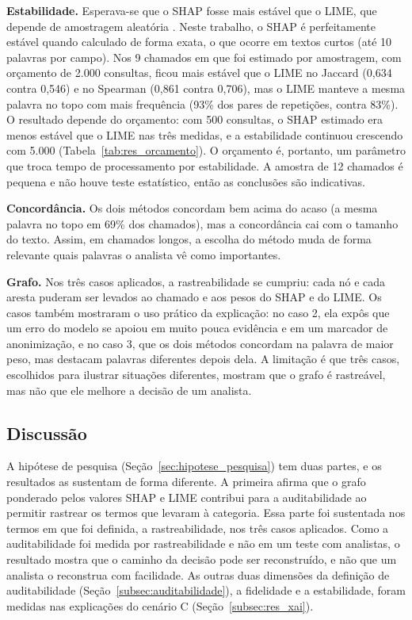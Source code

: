 \documentclass[
    12pt,                %
    openright,           %
    oneside,             %
    a4paper,             %
    english,             %
    brazil               %
]{abntex2}
\begin{document}
\textbf{Estabilidade.} Esperava-se que o SHAP fosse mais estável que o LIME, que depende de amostragem aleatória \cite{ribeiro2016}. Neste trabalho, o SHAP é perfeitamente estável quando calculado de forma exata, o que ocorre em textos curtos (até 10 palavras por campo). Nos 9 chamados em que foi estimado por amostragem, com orçamento de 2.000 consultas, ficou mais estável que o LIME no Jaccard (0,634 contra 0,546) e no Spearman (0,861 contra 0,706), mas o LIME manteve a mesma palavra no topo com mais frequência (93\% dos pares de repetições, contra 83\%). O resultado depende do orçamento: com 500 consultas, o SHAP estimado era menos estável que o LIME nas três medidas, e a estabilidade continuou crescendo com 5.000 (Tabela~\ref{tab:res_orcamento}). O orçamento é, portanto, um parâmetro que troca tempo de processamento por estabilidade. A amostra de 12 chamados é pequena e não houve teste estatístico, então as conclusões são indicativas.
 
\textbf{Concordância.} Os dois métodos concordam bem acima do acaso (a mesma palavra no topo em 69\% dos chamados), mas a concordância cai com o tamanho do texto. Assim, em chamados longos, a escolha do método muda de forma relevante quais palavras o analista vê como importantes.
 
\textbf{Grafo.} Nos três casos aplicados, a rastreabilidade se cumpriu: cada nó e cada aresta puderam ser levados ao chamado e aos pesos do SHAP e do LIME. Os casos também mostraram o uso prático da explicação: no caso 2, ela expôs que um erro do modelo se apoiou em muito pouca evidência e em um marcador de anonimização, e no caso 3, que os dois métodos concordam na palavra de maior peso, mas destacam palavras diferentes depois dela. A limitação é que três casos, escolhidos para ilustrar situações diferentes, mostram que o grafo é rastreável, mas não que ele melhore a decisão de um analista.

\subsection{Discussão}
A hipótese de pesquisa (Seção~\ref{sec:hipotese_pesquisa}) tem duas partes, e os resultados as sustentam de forma diferente. A primeira afirma que o grafo ponderado pelos valores SHAP e LIME contribui para a auditabilidade ao permitir rastrear os termos que levaram à categoria. Essa parte foi sustentada nos termos em que foi definida, a rastreabilidade, nos três casos aplicados. Como a auditabilidade foi medida por rastreabilidade e não em um teste com analistas, o resultado mostra que o caminho da decisão pode ser reconstruído, e não que um analista o reconstrua com facilidade. As outras duas dimensões da definição de auditabilidade (Seção~\ref{subsec:auditabilidade}), a fidelidade e a estabilidade, foram medidas nas explicações do cenário C (Seção~\ref{subsec:res_xai}).
 
\end{document}
